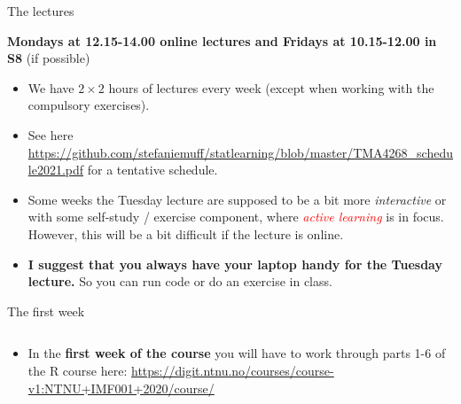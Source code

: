 \documentclass[10pt,ignorenonframetext,]{beamer}
\providecommand{\tightlist}{%
  \setlength{\itemsep}{0pt}\setlength{\parskip}{0pt}}
\begin{document}
\begin{frame}

\begin{block}{The lectures}

\vspace{2mm}

\textbf{Mondays at 12.15-14.00 online lectures and Fridays at
10.15-12.00 in S8} (if possible)

\vspace{2mm}

\begin{itemize}
\tightlist
\item
  We have \(2\times 2\) hours of lectures every week (except when
  working with the compulsory exercises).
\end{itemize}

\vspace{2mm}

\begin{itemize}
\tightlist
\item
  See here
  \url{https://github.com/stefaniemuff/statlearning/blob/master/TMA4268_schedule2021.pdf}
  for a tentative schedule.
\end{itemize}

\vspace{2mm}

\begin{itemize}
\tightlist
\item
  Some weeks the Tuesday lecture are supposed to be a bit more
  \emph{interactive} or with some self-study / exercise component, where
  \emph{\textcolor{red}{active learning}} is in focus. However, this
  will be a bit difficult if the lecture is online.
\end{itemize}

\vspace{2mm}

\begin{itemize}
\tightlist
\item
  \textbf{I suggest that you always have your laptop handy for the
  Tuesday lecture.} So you can run code or do an exercise in class.
\end{itemize}

\end{block}

\end{frame}

\begin{frame}

\begin{block}{The first week}

\(~\)

\begin{itemize}
\tightlist
\item
  In the \textbf{first week of the course} you will have to work through
  parts 1-6 of the R course here:
  \url{https://digit.ntnu.no/courses/course-v1:NTNU+IMF001+2020/course/}
\end{itemize}

\end{block}

\end{frame}
\end{document}
